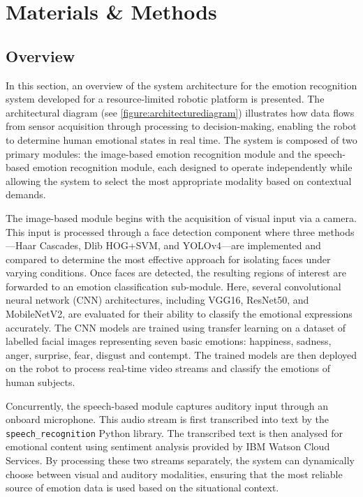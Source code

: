 \chapter{Materials \& Methods}
\section{Overview}

In this section, an overview of the system architecture for the emotion recognition system developed for a resource-limited robotic platform is presented. The architectural diagram (see \ref{figure:architecturediagram}) illustrates how data flows from sensor acquisition through processing to decision-making, enabling the robot to determine human emotional states in real time. The system is composed of two primary modules: the image-based emotion recognition module and the speech-based emotion recognition module, each designed to operate independently while allowing the system to select the most appropriate modality based on contextual demands.

The image-based module begins with the acquisition of visual input via a camera. This input is processed through a face detection component where three methods---Haar Cascades, Dlib HOG+SVM, and YOLOv4---are implemented and compared to determine the most effective approach for isolating faces under varying conditions. Once faces are detected, the resulting regions of interest are forwarded to an emotion classification sub-module. Here, several convolutional neural network (CNN) architectures, including VGG16, ResNet50, and MobileNetV2, are evaluated for their ability to classify the emotional expressions accurately. The CNN models are trained using transfer learning on a dataset of labelled facial images representing seven basic emotions: happiness, sadness, anger, surprise, fear, disgust and contempt. The trained models are then deployed on the robot to process real-time video streams and classify the emotions of human subjects.

Concurrently, the speech-based module captures auditory input through an onboard microphone. This audio stream is first transcribed into text by the \texttt{speech\_recognition} Python library. The transcribed text is then analysed for emotional content using sentiment analysis provided by IBM Watson Cloud Services. By processing these two streams separately, the system can dynamically choose between visual and auditory modalities, ensuring that the most reliable source of emotion data is used based on the situational context.

